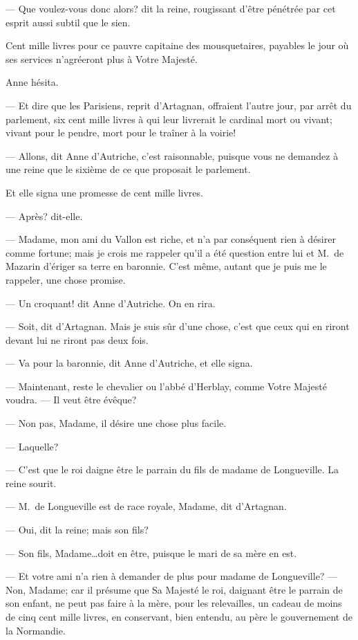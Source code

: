 — Que voulez-vous donc alors? dit la reine, rougissant d'être pénétrée par cet esprit aussi subtil que le sien.

Cent mille livres pour ce pauvre capitaine des mousquetaires, payables le jour où ses services n'agréeront plus à Votre Majesté.

Anne hésita.

— Et dire que les Parisiens, reprit d'Artagnan, offraient l'autre jour, par arrêt du parlement, six cent mille livres à qui leur livrerait le cardinal mort ou vivant; vivant pour le pendre, mort pour le traîner à la voirie!

— Allons, dit Anne d'Autriche, c'est raisonnable, puisque vous ne demandez à une reine que le sixième de ce que proposait le parlement.

Et elle signa une promesse de cent mille livres.

— Après? dit-elle.

— Madame, mon ami du Vallon est riche, et n'a par conséquent rien à désirer comme fortune; mais je crois me rappeler qu'il a été question entre lui et M.~de Mazarin d'ériger sa terre en baronnie. C'est même, autant que je puis me le rappeler, une chose promise.

— Un croquant! dit Anne d'Autriche. On en rira.

— Soit, dit d'Artagnan. Mais je suis sûr d'une chose, c'est que ceux qui en riront devant lui ne riront pas deux fois.

— Va pour la baronnie, dit Anne d'Autriche, et elle signa.

— Maintenant, reste le chevalier ou l'abbé d'Herblay, comme Votre Majesté voudra.
— Il veut être évêque?

— Non pas, Madame, il désire une chose plus facile.

— Laquelle?

— C'est que le roi daigne être le parrain du fils de madame de Longueville.
La reine sourit.

— M.~de Longueville est de race royale, Madame, dit d'Artagnan.

— Oui, dit la reine; mais son fils?

— Son fils, Madame\dots doit en être, puisque le mari de sa mère en est.

— Et votre ami n'a rien à demander de plus pour madame de Longueville?
— Non, Madame; car il présume que Sa Majesté le roi, daignant être le parrain de son enfant, ne peut pas faire à la mère, pour les relevailles, un cadeau de moins de cinq cent mille livres, en conservant, bien entendu, au père le gouvernement de la Normandie.

